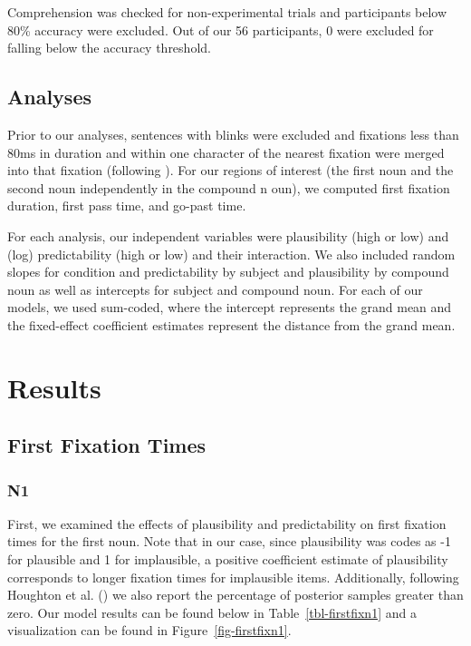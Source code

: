 \documentclass[
  letterpaper,
  DIV=11,
  numbers=noendperiod,
  nottoc,
  oneside]{scrreprt}
\begin{document}
Comprehension was checked for non-experimental trials and participants
below 80\% accuracy were excluded. Out of our 56 participants, 0 were
excluded for falling below the accuracy threshold.

\subsection{Analyses}\label{analyses}

Prior to our analyses, sentences with blinks were excluded and fixations
less than 80ms in duration and within one character of the nearest
fixation were merged into that fixation (following
). For
our regions of interest (the first noun and the second noun
independently in the compound n oun), we computed first fixation
duration, first pass time, and go-past time.

For each analysis, our independent variables were plausibility (high or
low) and (log) predictability (high or low) and their interaction. We
also included random slopes for condition and predictability by subject
and plausibility by compound noun as well as intercepts for subject and
compound noun. For each of our models, we used sum-coded, where the
intercept represents the grand mean and the fixed-effect coefficient
estimates represent the distance from the grand mean.

\section{Results}\label{results}

\subsection{First Fixation Times}\label{first-fixation-times}

\subsubsection{N1}\label{n1}

First, we examined the effects of plausibility and predictability on
first fixation times for the first noun. Note that in our case, since
plausibility was codes as -1 for plausible and 1 for implausible, a
positive coefficient estimate of plausibility corresponds to longer
fixation times for implausible items. Additionally, following Houghton
et al.
()
we also report the percentage of posterior samples greater than zero.
Our model results can be found below in Table~\ref{tbl-firstfixn1} and a
visualization can be found in Figure~\ref{fig-firstfixn1}.
\end{document}
